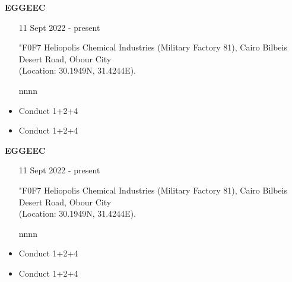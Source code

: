 
\begin{expbox}[title = {Maintenance Engineer}]
	{\bfseries EGGEEC}
	\begin{itemize}[nosep,align = left, leftmargin = !, labelwidth = ]
		\item[\faCalendar*] 11 Sept 2022 - present
		\item[{\seg\char"F0F7}] Heliopolis Chemical Industries (Military Factory 81),
							 Cairo Bilbeis Desert Road, Obour City \\ (Location: 30.1949N, 31.4244E).
		\item[\faMapMarker*] nnnn
	\end{itemize}
	{\color{light}\dotfill}\smallskip
	\begin{itemize}[nosep,align = left, leftmargin = !, labelwidth = ]
		\item Conduct 1+2+4
		\item Conduct 1+2+4
	\end{itemize}
\end{expbox}

\begin{expbox}[title = {Maintenance Engineer}]
	{\bfseries EGGEEC}
	\begin{itemize}[nosep,align = left, leftmargin = !, labelwidth = ]
		\item[\faCalendar*] 11 Sept 2022 - present
		\item[{\fontawe\char"F0F7}] Heliopolis Chemical Industries (Military Factory 81),
							 Cairo Bilbeis Desert Road, Obour City \\ (Location: 30.1949N, 31.4244E).
		\item[\faMapMarker*] nnnn
	\end{itemize}
	{\color{light}\dotfill}\smallskip
	\begin{itemize}[nosep,align = left, leftmargin = !, labelwidth = ]
		\item Conduct 1+2+4
		\item Conduct 1+2+4
	\end{itemize}
\end{expbox}